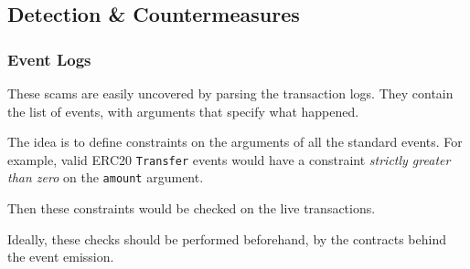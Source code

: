 \subsection{Detection \& Countermeasures}

\subsubsection{Event Logs}

These scams are easily uncovered by parsing the transaction logs.
They contain the list of events, with arguments that specify what happened.

The idea is to define constraints on the arguments of all the standard events.
For example, valid ERC20 \lstinline{Transfer} events would have a constraint \emph{strictly greater than zero} on the \lstinline{amount} argument.

Then these constraints would be checked on the live transactions.

Ideally, these checks should be performed beforehand, by the contracts behind the event emission.
